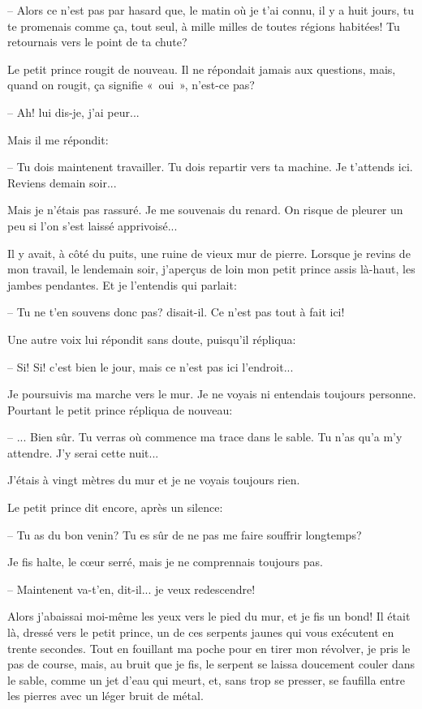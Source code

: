 \documentclass[a4paper]{report}
\begin{document}
-- Alors ce n'est pas par hasard que, le matin où je t'ai connu, il y a huit jours, tu te promenais comme ça, tout seul, à mille milles de toutes régions habitées! Tu retournais vers le point de ta chute?

Le petit prince rougit de nouveau. Il ne répondait jamais aux questions, mais, quand on rougit, ça signifie «~oui~», n'est-ce pas?

-- Ah! lui dis-je, j'ai peur...

Mais il me répondit:

-- Tu dois maintenent travailler. Tu dois repartir vers ta machine. Je t'attends ici. Reviens demain soir...

Mais je n'étais pas rassuré. Je me souvenais du renard. On risque de pleurer un peu si l'on s'est laissé apprivoisé...

\parachapter{} %
Il y avait, à côté du puits, une ruine de vieux mur de pierre. Lorsque je revins de mon travail, le lendemain soir, j'aperçus de loin mon petit prince assis là-haut, les jambes pendantes. Et je l'entendis qui parlait:

-- Tu ne t'en souvens donc pas? disait-il. Ce n'est pas tout à fait ici!

Une autre voix lui répondit sans doute, puisqu'il répliqua:

-- Si! Si! c'est bien le jour, mais ce n'est pas ici l'endroit...

Je poursuivis ma marche vers le mur. Je ne voyais ni entendais toujours personne. Pourtant le petit prince répliqua de nouveau:

-- ... Bien sûr. Tu verras où commence ma trace dans le sable. Tu n'as qu'a m'y attendre. J'y serai cette nuit...

J'étais à vingt mètres du mur et je ne voyais toujours rien.

Le petit prince dit encore, après un silence:

-- Tu as du bon venin? Tu es sûr de ne pas me faire souffrir longtemps?

Je fis halte, le cœur serré, mais je ne comprennais toujours pas.

-- Maintenent va-t'en, dit-il... je veux redescendre! 


Alors j'abaissai moi-même les yeux vers le pied du mur, et je fis un bond! Il était là, dressé vers le petit prince, un de ces serpents jaunes qui vous exécutent en trente secondes. Tout en fouillant ma poche pour en tirer mon révolver, je pris le pas de course, mais, au bruit que je fis, le serpent se laissa doucement couler dans le sable, comme un jet d'eau qui meurt, et, sans trop se presser, se faufilla entre les pierres avec un léger bruit de métal.
\end{document}
